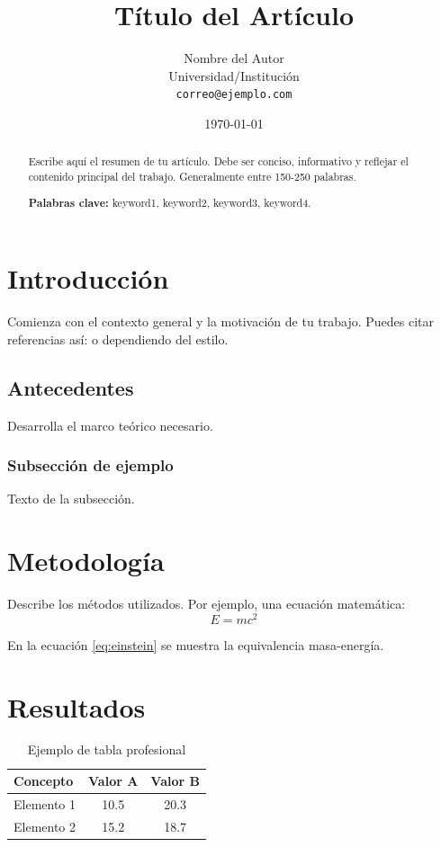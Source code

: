 \documentclass[12pt,a4paper]{article}
\title{\textbf{Título del Artículo}}
\author{Nombre del Autor \\
	\small Universidad/Institución \\
	\small \texttt{correo@ejemplo.com}}
\date{\today}
\theoremstyle{definition}
\theoremstyle{theorem}
\begin{document}
\maketitle

\begin{abstract}
\noindent Escribe aquí el resumen de tu artículo. Debe ser conciso, informativo y reflejar el contenido principal del trabajo. Generalmente entre 150-250 palabras.

\vspace{1em}
\noindent\textbf{Palabras clave:} keyword1, keyword2, keyword3, keyword4.
\end{abstract}

\section{Introducción}

Comienza con el contexto general y la motivación de tu trabajo. Puedes citar referencias así: \cite{autor2023} o \cite{autor2023} dependiendo del estilo.

\subsection{Antecedentes}

Desarrolla el marco teórico necesario.

\subsubsection{Subsección de ejemplo}

Texto de la subsección.

\section{Metodología}

Describe los métodos utilizados. Por ejemplo, una ecuación matemática:
\begin{equation}
	E = mc^2
	\label{eq:einstein}
\end{equation}

En la ecuación \eqref{eq:einstein} se muestra la equivalencia masa-energía.

\section{Resultados}

\begin{table}[htbp]
	\centering
	\caption{Ejemplo de tabla profesional}
	\begin{tabular}{@{}lcc@{}}
		\toprule
		Concepto & Valor A & Valor B \\
		\midrule
		Elemento 1 & 10.5 & 20.3 \\
		Elemento 2 & 15.2 & 18.7 \\
		\bottomrule
	\end{tabular}
	\label{tab:ejemplo}
\end{table}
\end{document}
